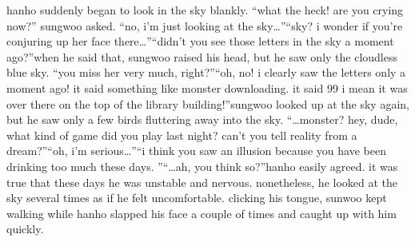  hanho suddenly began to look in the sky blankly.
“what the heck! are you crying now?” sungwoo asked.
“no, i’m just looking at the sky…”“sky? i wonder if you’re conjuring up her face there…”“didn’t you see those letters in the sky a moment ago?”when he said that, sungwoo raised his head, but he saw only the cloudless blue sky.
“you miss her very much, right?”“oh, no! i clearly saw the letters only a moment ago! it said something like monster downloading.
 it said 99%
 i mean it was over there on the top of the library building!”sungwoo looked up at the sky again, but he saw only a few birds fluttering away into the sky.
“…monster? hey, dude, what kind of game did you play last night? can’t you tell reality from a dream?”“oh, i’m serious…”“i think you saw an illusion because you have been drinking too much these days.
”“…ah, you think so?”hanho easily agreed.
 it was true that these days he was unstable and nervous.
 nonetheless, he looked at the sky several times as if he felt uncomfortable.
clicking his tongue, sunwoo kept walking while hanho slapped his face a couple of times and caught up with him quickly.

